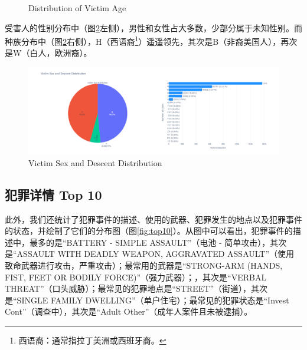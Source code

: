 \documentclass{article}
\begin{document}
\begin{figure}[htbp]
    \centering

    \hspace{0.5cm}

    \caption{Distribution of Victim Age}
    \label{fig:age}
\end{figure}

受害人的性别分布中（图\ref{fig:sex_and_descent}左侧），男性和女性占大多数，少部分属于未知性别。而种族分布中（图\ref{fig:sex_and_descent}右侧），H（西语裔\footnote{西语裔：通常指拉丁美洲或西班牙裔。}）遥遥领先，其次是B（非裔美国人），再次是W（白人，欧洲裔）。

\begin{figure}[H]
    \centering
    \includegraphics[width=1\textwidth]{../pic/sex_and_descent.png}
    \caption{Victim Sex and Descent Distribution}
    \label{fig:sex_and_descent}
\end{figure}

\subsection{犯罪详情 Top 10}
此外，我们还统计了犯罪事件的描述、使用的武器、犯罪发生的地点以及犯罪事件的状态，并绘制了它们的分布图（图\ref{fig:top10}）。从图中可以看出，犯罪事件的描述中，最多的是“BATTERY - SIMPLE ASSAULT”（电池 - 简单攻击），其次是“ASSAULT WITH DEADLY WEAPON, AGGRAVATED ASSAULT”（使用致命武器进行攻击，严重攻击）；最常用的武器是“STRONG-ARM (HANDS, FIST, FEET OR BODILY FORCE)”（强力武器）；，其次是“VERBAL THREAT”（口头威胁）；最常见的犯罪地点是“STREET”（街道），其次是“SINGLE FAMILY DWELLING”（单户住宅）；最常见的犯罪状态是“Invest Cont”（调查中），其次是“Adult Other”（成年人案件且未被逮捕）。
\end{document}
